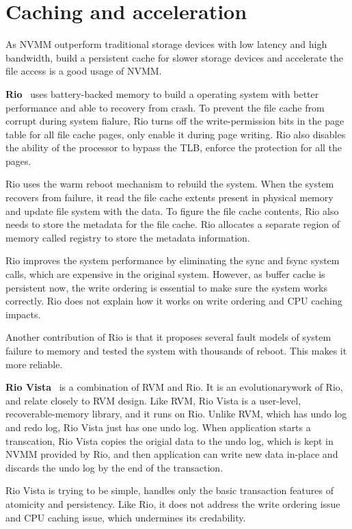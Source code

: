 \section{Caching and acceleration} 
\label{sec:caching}

As NVMM outperform traditional storage devices with low latency and high
bandwidth, build a persistent cache for slower storage devices and
accelerate the file access is a good usage of NVMM. 

\textbf{Rio}~\cite{riofilecache} uses battery-backed memory to build a
operating system
with better performance and able to recovery from crash. To prevent the file
cache from corrupt during system fialure, Rio turns off the write-permission
bits in the page table for all file cache pages, only enable it during page
writing. Rio also disables the ability of the processor to bypass the TLB,
enforce the protection for all the pages.

Rio uses the warm reboot mechanism to rebuild the system. When the system 
recovers from failure, it read the file cache extents present in physical memory
and update file system with the data. To figure the file cache contents,
Rio also needs to store the metadata for the file cache. Rio allocates a
separate region of memory called registry to store the metadata information.

Rio improves the system performance by eliminating the sync and fsync system
calls, which are expensive in the original system. However, as buffer cache
is persistent now, the write ordering is essential to make sure the system
works correctly. Rio does not explain how it works on write ordering and CPU
caching impacts.

Another contribution of Rio is that it proposes several fault models of system
failure to memory and tested the system with thousands of reboot. This makes
it more reliable.
 
\textbf{Rio Vista}~\cite{riovista} is a combination of RVM and Rio.
It is an evolutionarywork of Rio, and relate closely to RVM design.
Like RVM, Rio Vista is a
user-level, recoverable-memory library, and it runs on Rio. Unlike RVM,
which has undo log and redo log, Rio Vista just has one undo log. When
application starts a transcation, Rio Vista copies the origial data to the 
undo log, which is kept in NVMM provided by Rio, and then application can
write new data in-place and discards the undo log by the end of the transaction.

Rio Vista is trying to be simple, handles only the basic transaction features
of atomicity and persistency. Like Rio, it does not address the write ordering
issue and CPU caching issue, which undermines its credability. 

